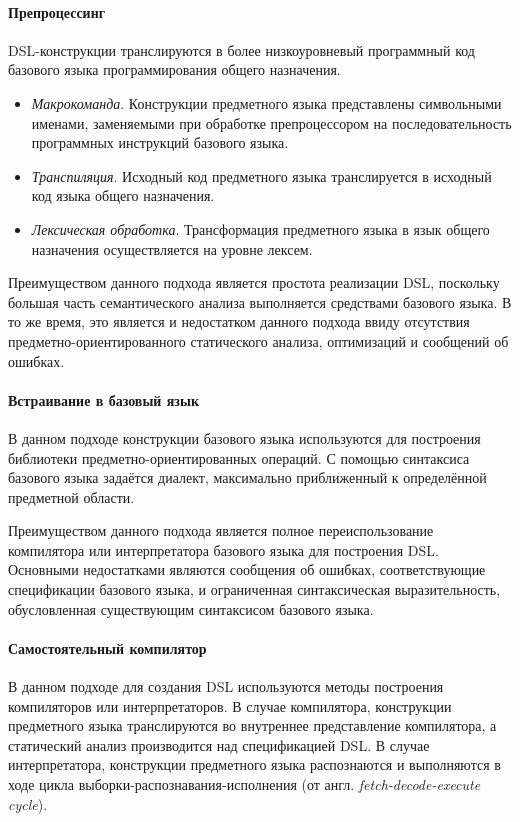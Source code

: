 \paragraph{Препроцессинг}
DSL-конструкции транслируются в более низкоуровневый программный код
базового языка программирования общего назначения.
\begin{itemize}
	\item \textit{Макрокоманда}. Конструкции предметного языка представлены
	символьными именами, заменяемыми при обработке препроцессором на
	последовательность программных инструкций базового языка.
	\item \textit{Транспиляция}. Исходный код предметного языка
	транслируется в исходный код языка общего назначения.
	\item \textit{Лексическая обработка}. Трансформация предметного языка в
	язык общего назначения осуществляется на уровне лексем.
\end{itemize}

Преимуществом данного подхода является простота реализации DSL, поскольку
большая часть семантического анализа выполняется средствами базового языка.
В то же время, это является и недостатком данного подхода ввиду отсутствия
предметно-ориентированного статического анализа, оптимизаций и сообщений об ошибках.

\paragraph{Встраивание в базовый язык}
В данном подходе конструкции базового языка используются для построения
библиотеки предметно-ориен\-тированных операций. С помощью синтаксиса
базового языка задаётся диалект, максимально приближенный к определённой
предметной области.

Преимуществом данного подхода является полное переиспользование компилятора или интерпретатора базового языка для построения DSL. Основными недостатками
являются сообщения об ошибках, соответствующие спецификации базового языка,
и ограниченная синтаксическая выразительность, обусловленная
существующим синтаксисом базового языка.

\paragraph{Самостоятельный компилятор}
В данном подходе для создания DSL используются методы построения
компиляторов или интерпретаторов. В случае компилятора, конструкции
предметного языка транслируются во внутреннее представление компилятора, а
статический анализ производится над спецификацией DSL. В случае
интерпретатора, конструкции предметного языка распознаются и выполняются
в ходе цикла выборки-распознавания-исполнения (от англ.
\textit{fetch-decode-execute cycle}).

